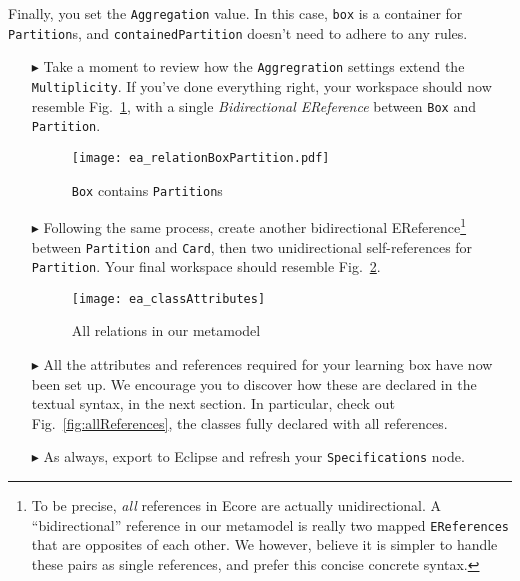 Finally, you set the \texttt{Aggregation} value. In this case, \texttt{box} is a
container for \texttt{Partition}s, and \texttt{containedPartition} doesn't need to adhere to any rules.

\begin{itemize}

\item[$\blacktriangleright$] Take a moment to review how the \texttt{Aggregration} settings extend the \texttt{Multiplicity}. If you've done everything right,
your workspace should now resemble Fig.~\ref{fig:ereference_completed}, with a single \emph{Bidirectional EReference} between \texttt{Box} and \texttt{Partition}.

\vspace{1cm}

\begin{figure}[htbp]
	\centering
  \texttt{[image: ea\_relationBoxPartition.pdf]}
	\caption{\texttt{Box} contains \texttt{Partition}s}
	\label{fig:ereference_completed}
\end{figure}
\FloatBarrier

\clearpage

\item[$\blacktriangleright$] Following the same process, create another bidirectional EReference\footnote{To be precise, \emph{all} references in Ecore are
actually unidirectional.
A ``bidirectional'' reference in our metamodel is really two mapped \texttt{EReferences} that are opposites of each other.
We however, believe it is simpler to handle these pairs as single references, and prefer this concise concrete syntax.} between \texttt{Partition} and
\texttt{Card}, then two unidirectional self-references for \texttt{Partition}. Your final workspace should resemble Fig.~\ref{fig:ereferences_all}.


\vspace{1cm}

\begin{figure}[htbp]
	\centering
  \texttt{[image: ea\_classAttributes]}
	\caption{All relations in our metamodel}
	\label{fig:ereferences_all}
\end{figure}

\FloatBarrier

\item[$\blacktriangleright$] All the attributes and references required for your learning box have now been set up. We encourage you to discover how these are
declared in the textual syntax, in the next section. In particular, check out Fig.~\ref{fig:allReferences}, the classes fully declared with all references.

\item[$\blacktriangleright$] As always, export to Eclipse and refresh your \texttt{Specifications} node.


\end{itemize}
